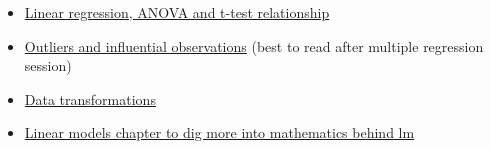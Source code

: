 \documentclass[]{article}
\providecommand{\tightlist}{%
  \setlength{\itemsep}{0pt}\setlength{\parskip}{0pt}}
\begin{document}
\begin{itemize}
\tightlist
\item
  \href{https://newonlinecourses.science.psu.edu/stat501/node/286/}{Linear
  regression, ANOVA and t-test relationship}
\item
  \href{https://newonlinecourses.science.psu.edu/stat501/node/286/}{Outliers
  and influential observations} (best to read after multiple regression
  session)
\item
  \href{https://newonlinecourses.science.psu.edu/stat501/node/318/}{Data
  transformations}
\item
  \href{http://www.rwdc2.com/files/rafa.pdf}{Linear models chapter to
  dig more into mathematics behind lm}
\end{itemize}
\end{document}
